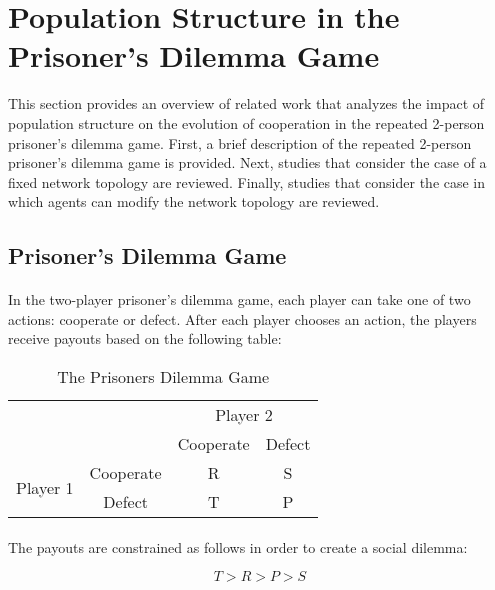 \documentclass{article}
\begin{document}
    \section{Population Structure in the Prisoner's Dilemma Game}
    This section provides an overview of related work that analyzes the impact of population structure on the evolution of cooperation in the repeated 2-person prisoner's dilemma game.  First, a brief description of the repeated 2-person prisoner's dilemma game is provided.  Next, studies that consider the case of a fixed network topology are reviewed.  Finally, studies that consider the case in which agents can modify the network topology are reviewed.
    
    \subsection{Prisoner's Dilemma Game}
    \paragraph{}In the two-player prisoner's dilemma game, each player can take one of two actions: cooperate or defect.  After each player chooses an action, the players receive payouts based on the following table:
    
    \begin{table}[h!]
      \begin{center}
      \begin{tabular}{cccc}
    	\toprule
    		&	&	\multicolumn{2}{c}{Player 2} \\
    		&   & 	Cooperate & Defect  \\ \midrule
    	\multirow{2}{*}{Player 1}
    		& Cooperate   & R  & S  \\
    		& Defect  	  & T  & P \\ \bottomrule
      \end{tabular}
      \caption{The Prisoners Dilemma Game}
	  \end{center}
    \end{table}

    \paragraph{}The payouts are constrained as follows in order to create a social dilemma:
    
    \begin{equation}
    	T > R > P > S
    \end{equation}
    
\end{document}
